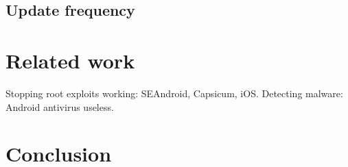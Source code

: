 \documentclass[conference,a4paper,twoside]{IEEEtran}
\begin{document}
\subsection{Update frequency}

\section{Related work}
\label{sec:related}
Stopping root exploits working: SEAndroid, Capsicum, iOS.
Detecting malware: Android antivirus useless.


\section{Conclusion}
\label{sec:conclusion}
\end{document}
